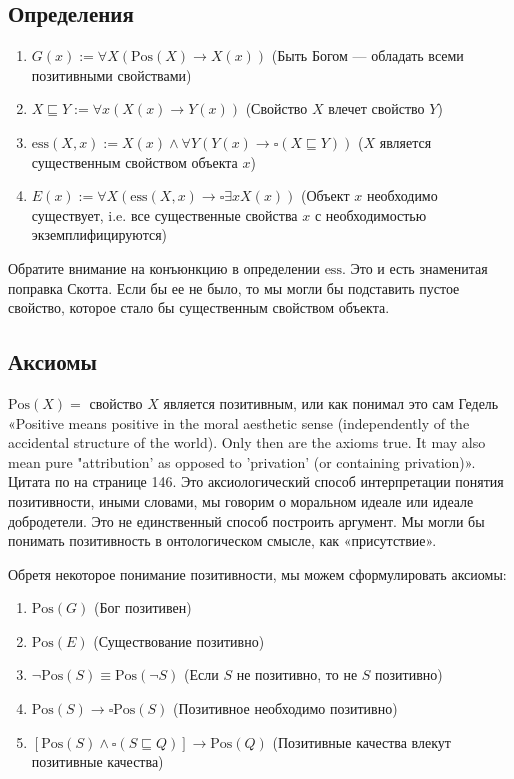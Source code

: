 \documentclass[openany]{book}
\theoremstyle{plain}
\theoremstyle{definition}
\begin{document}
\subsection{Определения}
\begin{enumerate}
    \item \(G(x) := \forall X (\mathrm{Pos}(X) \rightarrow X(x))\) (Быть Богом --- обладать всеми позитивными свойствами)
    \item \(X \sqsubseteq Y := \forall x (X(x) \rightarrow Y(x))\) (Свойство \(X\) влечет свойство \(Y\))
    \item \(\mathrm{ess}(X, x) := X(x) \land \forall Y (Y(x) \rightarrow \square (X \sqsubseteq Y))\) (\(X\) является существенным свойством объекта \(x\))
    \item \(E(x) := \forall X (\mathrm{ess}(X, x) \rightarrow \square \exists x X(x))\) (Объект \(x\) необходимо существует, i.e. все существенные свойства \(x\) с необходимостью экземплифицируются)
\end{enumerate}

Обратите внимание на конъюнкцию в определении \(\mathrm{ess}\). Это и есть знаменитая поправка Скотта. Если бы ее не было, то мы могли бы подставить пустое свойство, которое стало бы существенным  свойством объекта.

\subsection{Аксиомы}

\(\mathrm{Pos}(X) =\) свойство \(X\) является позитивным, или как понимал это сам Гедель
«Positive means positive in the moral aesthetic sense (independently of the accidental structure of the world). Only then are the axioms true. It may also mean pure "attribution' as opposed to 'privation' (or containing privation)». Цитата по \cite{Fitting} на странице 146. Это аксиологический способ интерпретации понятия позитивности, иными словами, мы говорим о моральном идеале или идеале добродетели. Это не единственный способ построить аргумент. Мы могли бы понимать позитивность в онтологическом смысле, как «присутствие».

Обретя некоторое понимание позитивности, мы можем сформулировать аксиомы:
\begin{enumerate}
    \item \(\mathrm{Pos}(G)\) (Бог позитивен)
    \item \(\mathrm{Pos}(E)\) (Существование позитивно)
    \item \(\neg \mathrm{Pos}(S) \equiv \mathrm{Pos}(\neg S)\) (Если \(S\) не позитивно, то не \(S\) позитивно)
    \item \(\mathrm{Pos}(S) \to \square \mathrm{Pos}(S)\) (Позитивное необходимо позитивно)
    \item \([\mathrm{Pos}(S) \land \square (S \sqsubseteq Q)] \to \mathrm{Pos}(Q)\) (Позитивные качества влекут позитивные качества)
\end{enumerate}
\end{document}
